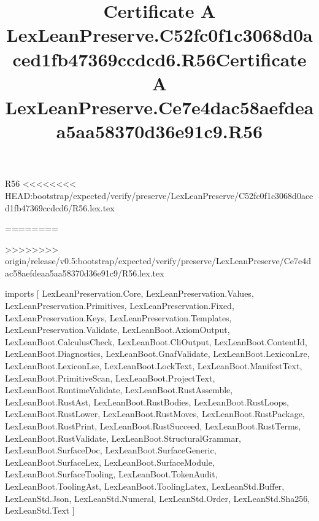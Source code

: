 \begin{lexlean}{R56}
<<<<<<<< HEAD:bootstrap/expected/verify/preserve/LexLeanPreserve/C52fc0f1c3068d0aced1fb47369ccdcd6/R56.lex.tex
\title{Certificate A LexLeanPreserve.C52fc0f1c3068d0aced1fb47369ccdcd6.R56}
========
\title{Certificate A LexLeanPreserve.Ce7e4dac58aefdeaa5aa58370d36e91c9.R56}
>>>>>>>> origin/release/v0.5:bootstrap/expected/verify/preserve/LexLeanPreserve/Ce7e4dac58aefdeaa5aa58370d36e91c9/R56.lex.tex
\begin{coremodule}
imports [
  LexLeanPreservation.Core,
  LexLeanPreservation.Values,
  LexLeanPreservation.Primitives,
  LexLeanPreservation.Fixed,
  LexLeanPreservation.Keys,
  LexLeanPreservation.Templates,
  LexLeanPreservation.Validate,
  LexLeanBoot.AxiomOutput,
  LexLeanBoot.CalculusCheck,
  LexLeanBoot.CliOutput,
  LexLeanBoot.ContentId,
  LexLeanBoot.Diagnostics,
  LexLeanBoot.GnafValidate,
  LexLeanBoot.LexiconLre,
  LexLeanBoot.LexiconLse,
  LexLeanBoot.LockText,
  LexLeanBoot.ManifestText,
  LexLeanBoot.PrimitiveScan,
  LexLeanBoot.ProjectText,
  LexLeanBoot.RuntimeValidate,
  LexLeanBoot.RustAssemble,
  LexLeanBoot.RustAst,
  LexLeanBoot.RustBodies,
  LexLeanBoot.RustLoops,
  LexLeanBoot.RustLower,
  LexLeanBoot.RustMoves,
  LexLeanBoot.RustPackage,
  LexLeanBoot.RustPrint,
  LexLeanBoot.RustSucceed,
  LexLeanBoot.RustTerms,
  LexLeanBoot.RustValidate,
  LexLeanBoot.StructuralGrammar,
  LexLeanBoot.SurfaceDoc,
  LexLeanBoot.SurfaceGeneric,
  LexLeanBoot.SurfaceLex,
  LexLeanBoot.SurfaceModule,
  LexLeanBoot.SurfaceTooling,
  LexLeanBoot.TokenAudit,
  LexLeanBoot.ToolingAst,
  LexLeanBoot.ToolingLatex,
  LexLeanStd.Buffer,
  LexLeanStd.Json,
  LexLeanStd.Numeral,
  LexLeanStd.Order,
  LexLeanStd.Sha256,
  LexLeanStd.Text
]


\end{coremodule}
\end{lexlean}
